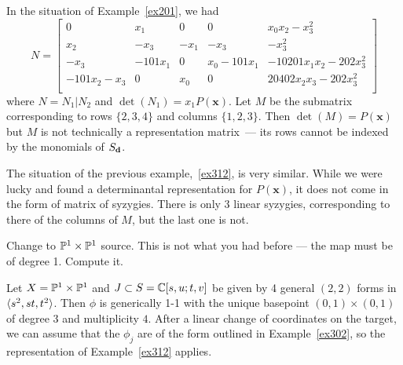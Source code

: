 \documentclass[fleqn,reqno]{amsart}
\begin{document}
\begin{example}[$\mt{ex313}$]
\label{ex313}
In the situation of Example~\ref{ex201}, we had
\[
	N=\begin{bmatrix}0&
	       {x}_{1}&
	       0&
	       0&
	       {x}_{0} {x}_{2}-{x}_{3}^{2}\\
	       {x}_{2}&
	       {-{x}_{3}}&
	       {-{x}_{1}}&
	       {-{x}_{3}}&
	       {-{x}_{3}^{2}}\\
	       {-{x}_{3}}&
	       {-101 {x}_{1}}&
	       0&
	       {x}_{0}-101 {x}_{1}&
	       -10201 {x}_{1} {x}_{2}-202 {x}_{3}^{2}\\
	       -101 {x}_{2}-{x}_{3}&
	       0&
	       {x}_{0}&
	       0&
	       20402 {x}_{2} {x}_{3}-202 {x}_{3}^{2}\\
	       \end{bmatrix}
\]
where $N=N_1|N_2$ and $\det(N_1)=x_1P(\mathbf x)$.
Let $M$ be the submatrix corresponding to rows $\{2,3,4\}$ and columns $\{1,2,3\}$.
Then $\det(M)=P(\mathbf x)$ but $M$ is not technically a representation matrix~---
its rows cannot be indexed by the monomials of $S_\mathbf d$.

The situation of the previous example,~\ref{ex312}, is very similar.
While we were lucky and found a determinantal representation for $P(\mathbf x)$,
it does not come in the form of matrix of syzygies.
There is only $3$ linear syzygies, corresponding to there of the columns of $M$,
but the last one is not.
\end{example}

\begin{example}[$\mt{ex318}$]
\label{ex318}
Change to $\mathbb{P}^1\times\mathbb{P}^1$ source. This is not what you had before --- the map
must be of degree 1. Compute it.
\end{example}

\begin{example}[$\mt{ex319}$]
\label{ex319}
Let $X=\mathbb{P}^1\times\mathbb{P}^1$ and $J\subset S=\mathbb{C}[s,u;t,v]$ be given by 4 general $(2,2)$ forms in $\langle s^2,st,t^2\rangle$.
Then $\phi$ is generically 1-1 with
the unique basepoint $(0,1)\times(0,1)$ of degree $3$ and multiplicity $4$.
After a linear change of coordinates on the target,
we can assume that the $\phi_j$ are of the form outlined in Example~\ref{ex302},
so the representation of Example~\ref{ex312} applies.
\end{example}
\end{document}
